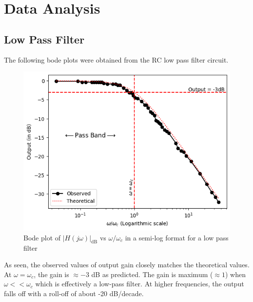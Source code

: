 \section{Data Analysis}

\subsection*{Low Pass Filter}
The following bode plots were obtained from the RC low pass filter circuit.

\begin{figure}[H]
        \centering
        \includegraphics[width=0.9\columnwidth]{images/g1.png}
        \caption{Bode plot of $|H(j\omega)|_\text{dB}$ vs $\omega/\omega_c$ in a semi-log format for a low pass filter}
        \label{graph:1}
\end{figure}
    


As seen, the observed values of output gain closely matches the theoretical values. At $\omega = \omega_c$, the gain is $\approx -3$ dB as predicted. The gain is maximum ($\approx 1$) when $\omega << \omega_c$ which is effectively a low-pass filter. At higher frequencies, the output falls off with a roll-off of about -20 dB/decade.

